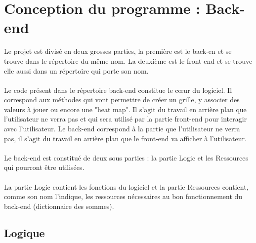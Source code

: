 \documentclass[french,12pt]{article}
\begin{document}
\section{Conception du programme : Back-end}
Le projet est divisé en deux grosses parties, la première est le back-en et se trouve dans le répertoire du même nom. La deuxième est le front-end et se trouve elle aussi dans un répertoire qui porte son nom.
\\ \\
Le code présent dans le répertoire back-end constitue le cœur du logiciel. Il correspond aux méthodes qui vont permettre de créer un grille, y associer des valeurs à jouer ou  encore une "heat map". Il s'agit du travail en arrière plan que l'utilisateur ne verra pas et qui sera utilisé par la partie front-end pour interagir avec l'utilisateur.
Le back-end correspond à la partie que l'utilisateur ne verra pas, il s'agit du travail en arrière plan que le front-end va afficher à l'utilisateur. \\ \\ 
Le back-end est constitué de deux sous parties : la partie Logic et les Ressources qui pourront être utilisées. \\ \\
La partie Logic contient les fonctions du logiciel et la partie Ressources contient, comme son nom l'indique, les ressources nécessaires au bon fonctionnement du back-end (dictionnaire des sommes).

 
\subsection{Logique}
\end{document}
